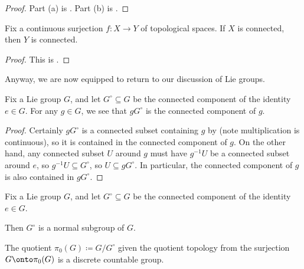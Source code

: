 \documentclass[../notes.tex]{subfiles}
\begin{document}
\begin{proof}
	Part (a) is \cite[Lemma~A.16]{elber-top}. Part (b) is \cite[Proposition~1.39]{elber-diff-top}.
\end{proof}
\begin{lemma} \label{lem:top-ivt}
	Fix a continuous surjection $f\colon X\to Y$ of topological spaces. If $X$ is connected, then $Y$ is connected.
\end{lemma}
\begin{proof}
	This is \cite[Lemma~A.8]{elber-top}.
\end{proof}
Anyway, we are now equipped to return to our discussion of Lie groups.
\begin{lemma} \label{lem:components-of-lie-group}
	Fix a Lie group $G$, and let $G^\circ\subseteq G$ be the connected component of the identity $e\in G$. For any $g\in G$, we see that $gG^\circ$ is the connected component of $g$.
\end{lemma}
\begin{proof}
	Certainly $gG^\circ$ is a connected subset containing $g$ by  (note multiplication is continuous), so it is contained in the connected component of $g$. On the other hand, any connected subset $U$ around $g$ must have $g^{-1}U$ be a connected subset around $e$, so $g^{-1}U\subseteq G^\circ$, so $U\subseteq gG^\circ$. In particular, the connected component of $g$ is also contained in $gG^\circ$.
\end{proof}
\begin{proposition}
	Fix a Lie group $G$, and let $G^\circ\subseteq G$ be the connected component of the identity $e\in G$.
	\begin{listalph}
		\item Then $G^\circ$ is a normal subgroup of $G$.
		\item The quotient $\pi_0(G)\coloneqq G/G^\circ$ given the quotient topology from the surjection $G\onto\pi_0(G)$ is a discrete countable group.
	\end{listalph}
\end{proposition}
\end{document}
